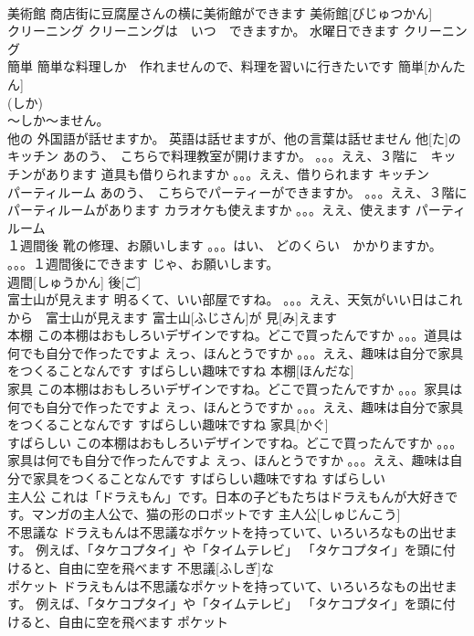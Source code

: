 \documentclass[8pt]{extreport}
\begin{document}
\begin{CJK}{UTF8}{min}
\\	美術館	商店街に豆腐屋さんの横に美術館ができます	美術館[びじゅつかん]					
\\	クリーニング	クリーニングは　いつ　できますか。 水曜日できます	クリーニング			
\\	簡単	簡単な料理しか　作れませんので、料理を習いに行きたいです	簡単[かんたん]			
\\	(しか) 
\\	～しか～ません。
\\	他の	外国語が話せますか。 英語は話せますが、他の言葉は話せません	他[た]の			
\\	キッチン	あのう、　こちらで料理教室が開けますか。 。。。ええ、３階に　キッチンがあります 道具も借りられますか 。。。ええ、借りられます	キッチン						
\\	パーティルーム	あのう、　こちらでパーティーができますか。 。。。ええ、３階に　パーティルームがあります カラオケも使えますか 。。。ええ、使えます	パーティルーム						
\\	１週間後	靴の修理、お願いします 。。。はい、 どのくらい　かかりますか。 。。。１週間後にできます じゃ、お願いします。	
\\	週間[しゅうかん] 後[ご]			
\\	富士山が見えます	明るくて、いい部屋ですね。 。。。ええ、天気がいい日はこれから　富士山が見えます	富士山[ふじさん]が 見[み]えます					
\\	本棚	この本棚はおもしろいデザインですね。どこで買ったんですか 。。。道具は何でも自分で作ったですよ えっ、ほんとうですか 。。。ええ、趣味は自分で家具をつくることなんです すばらしい趣味ですね	本棚[ほんだな]					
\\	家具	この本棚はおもしろいデザインですね。どこで買ったんですか 。。。家具は何でも自分で作ったですよ えっ、ほんとうですか 。。。ええ、趣味は自分で家具をつくることなんです すばらしい趣味ですね	家具[かぐ]			
\\	すばらしい	この本棚はおもしろいデザインですね。どこで買ったんですか 。。。家具は何でも自分で作ったんですよ えっ、ほんとうですか 。。。ええ、趣味は自分で家具をつくることなんです すばらしい趣味ですね	すばらしい			
\\	主人公	これは「ドラえもん」です。日本の子どもたちはドラえもんが大好きです。マンガの主人公で、猫の形のロボットです	主人公[しゅじんこう]			
\\	不思議な	ドラえもんは不思議なポケットを持っていて、いろいろなもの出せます。 例えば、「タケコプタイ」や「タイムテレビ」 「タケコプタイ」を頭に付けると、自由に空を飛べます	不思議[ふしぎ]な			
\\	ポケット	ドラえもんは不思議なポケットを持っていて、いろいろなもの出せます。 例えば、「タケコプタイ」や「タイムテレビ」 「タケコプタイ」を頭に付けると、自由に空を飛べます	ポケット			

\end{CJK}
\end{document}
